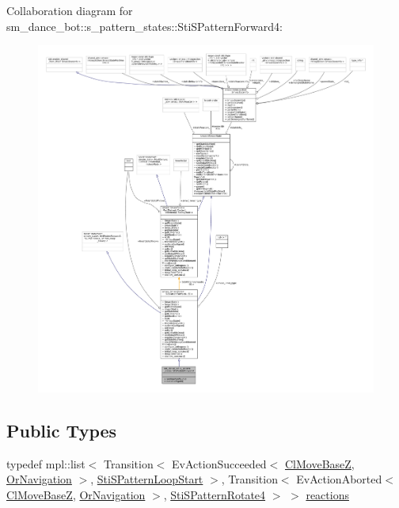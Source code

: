 Collaboration diagram for sm\+\_\+dance\+\_\+bot\+:\+:s\+\_\+pattern\+\_\+states\+:\+:Sti\+S\+Pattern\+Forward4\+:
\nopagebreak
\begin{figure}[H]
\begin{center}
\leavevmode
\includegraphics[width=350pt]{structsm__dance__bot_1_1s__pattern__states_1_1StiSPatternForward4__coll__graph}
\end{center}
\end{figure}
\subsection*{Public Types}
\begin{DoxyCompactItemize}
\item 
typedef mpl\+::list$<$ Transition$<$ Ev\+Action\+Succeeded$<$ \hyperlink{classmove__base__z__client_1_1ClMoveBaseZ}{Cl\+Move\+BaseZ}, \hyperlink{classsm__dance__bot_1_1OrNavigation}{Or\+Navigation} $>$, \hyperlink{structsm__dance__bot_1_1s__pattern__states_1_1StiSPatternLoopStart}{Sti\+S\+Pattern\+Loop\+Start} $>$, Transition$<$ Ev\+Action\+Aborted$<$ \hyperlink{classmove__base__z__client_1_1ClMoveBaseZ}{Cl\+Move\+BaseZ}, \hyperlink{classsm__dance__bot_1_1OrNavigation}{Or\+Navigation} $>$, \hyperlink{structsm__dance__bot_1_1s__pattern__states_1_1StiSPatternRotate4}{Sti\+S\+Pattern\+Rotate4} $>$ $>$ \hyperlink{structsm__dance__bot_1_1s__pattern__states_1_1StiSPatternForward4_a4a0eaecaf39945c6a9b01c8536898455}{reactions}
\end{DoxyCompactItemize}
